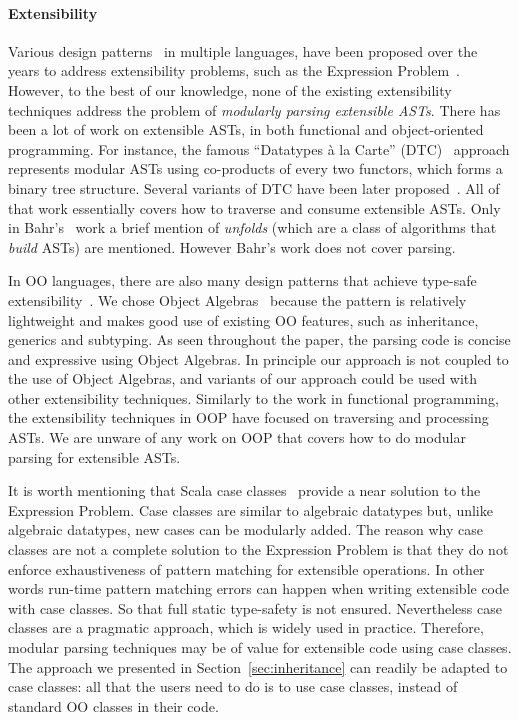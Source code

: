 \paragraph{Extensibility} Various design patterns~\cite{gamma1995design} in multiple
languages, have been proposed over the years to address extensibility
problems, such as the Expression Problem~\cite{wadler1998expression}. However, to the best
of our knowledge, none of the existing extensibility techniques
address the problem of \emph{modularly
parsing extensible ASTs}.  There has been
a lot of work on extensible ASTs, in both functional and
object-oriented programming.  For instance, the famous ``Datatypes \`a
la Carte'' (DTC)~\cite{swierstra2008data} approach represents modular ASTs using co-products
of every two functors, which forms a binary tree structure.
Several variants of DTC have been later proposed~\cite{Bahr2011,Bahr2014,Oliveira2015}.
All of that work essentially covers how to traverse and
consume extensible ASTs.
Only in Bahr's~\cite{Bahr2011} work a brief mention of \emph{unfolds}
(which are a class of algorithms that \emph{build} ASTs) are mentioned.
However Bahr's work does not cover parsing.

In OO languages, there are also many design patterns that achieve
type-safe extensibility~\cite{torgersen2004expression,odersky2005independently,oliveira2009modular,Oliveira:2012,wang2016expression}. We chose Object Algebras~\cite{Oliveira:2012} because the pattern is
relatively lightweight and makes good use of existing OO features,
such as inheritance, generics and subtyping. As seen throughout the paper,
the parsing code is concise and expressive using Object Algebras.
In principle our approach is not coupled to the use of Object
Algebras, and variants of our approach could be used with other
extensibility techniques. Similarly to the work in functional
programming, the extensibility techniques in OOP have focused
on traversing and processing ASTs. We are unware of any work on OOP
that covers how to do modular parsing for extensible ASTs.

It is worth mentioning that Scala case classes~\cite{emir2007matching} provide a near
solution to the Expression Problem. Case classes are similar to
algebraic datatypes but, unlike algebraic datatypes, new cases can be
modularly added. The reason why case classes are not a complete
solution to the Expression Problem is that they do not enforce
exhaustiveness of pattern matching for extensible operations. In other
words run-time pattern matching errors can happen when writing extensible code with case classes. So that full static type-safety is not ensured. Nevertheless case classes are a pragmatic approach, which is
widely used in practice. Therefore, modular parsing techniques may be
of value for extensible code using case classes.  The approach we
presented in Section~\ref{sec:inheritance} can readily be adapted to case classes:
all that the users need to do is to use case classes, instead of
standard OO classes in their code.

